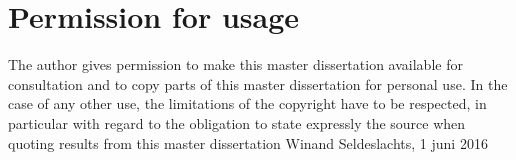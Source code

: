 \chapter*{Permission for usage}
The author gives permission to make this master dissertation available for consultation and to copy parts of this master dissertation for personal use.
\npar
In the case of any other use, the limitations of the copyright have to be respected, in particular with regard to the obligation to state expressly the source when quoting results from this master dissertation
\npar
Winand Seldeslachts, 1 juni 2016